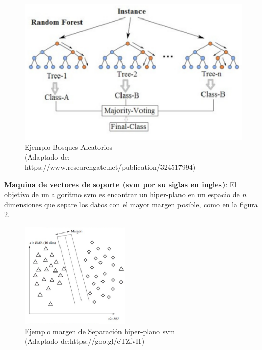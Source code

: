 \begin{figure}[H]
 \centering
  \includegraphics[scale=0.6,keepaspectratio=true,clip=true]{imagenes/MarcoTeorico/random-forest.png}
  \caption{Ejemplo Bosques Aleatorios \\ (Adaptado de: https://www.researchgate.net/publication/324517994)}
  \label{Fig: random_forest}
\end{figure}

\par \textbf{Maquina de vectores de soporte (\ac{svm} por su siglas en ingles)}: El objetivo de un algoritmo \ac{svm} es encontrar un hiper-plano en un espacio de $n$ dimensiones que separe los datos con el mayor margen posible, como en la figura \ref{Fig: margenseparacionsvm}. 

\begin{figure}[H]
 \centering
  \includegraphics[height=5cm,keepaspectratio=true,clip=true]{imagenes/MarcoTeorico/separacionsvm.png}
  \caption{Ejemplo margen de Separación hiper-plano \ac{svm} \\(Adaptado de:{https://goo.gl/eTZfvH})}
  \label{Fig: margenseparacionsvm}
\end{figure}

